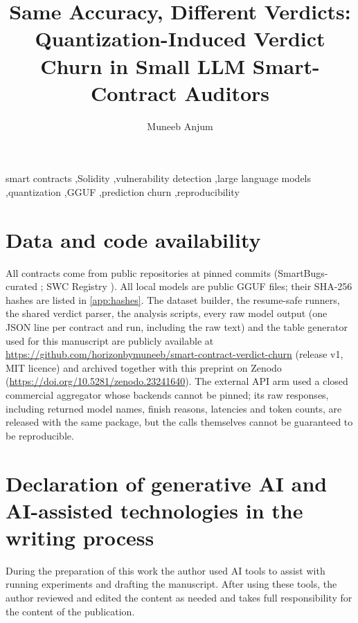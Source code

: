 \documentclass[preprint,10pt,a4paper]{elsarticle}
\begin{document}
\begin{frontmatter}
\title{Same Accuracy, Different Verdicts: Quantization-Induced Verdict Churn in Small LLM Smart-Contract Auditors}

\author{Muneeb Anjum}



\begin{keyword}
smart contracts \sep Solidity \sep vulnerability detection \sep large language models \sep quantization \sep GGUF \sep prediction churn \sep reproducibility
\end{keyword}
\end{frontmatter}



\section*{Data and code availability}\label{sec:repro}
All contracts come from public repositories at pinned commits (SmartBugs-curated \texttt{}; SWC Registry \texttt{}). All local models are public GGUF files; their SHA-256 hashes are listed in \ref{app:hashes}. The dataset builder, the resume-safe runners, the shared verdict parser, the analysis scripts, every raw model output (one JSON line per contract and run, including the raw text) and the table generator used for this manuscript are publicly available at \url{https://github.com/horizonbymuneeb/smart-contract-verdict-churn} (release v1, MIT licence) and archived together with this preprint on Zenodo (\url{https://doi.org/10.5281/zenodo.23241640}). The external API arm used a closed commercial aggregator whose backends cannot be pinned; its raw responses, including returned model names, finish reasons, latencies and token counts, are released with the same package, but the calls themselves cannot be guaranteed to be reproducible.

\section*{Declaration of generative AI and AI-assisted technologies in the writing process}
During the preparation of this work the author used AI tools to assist with running experiments and drafting the manuscript. After using these tools, the author reviewed and edited the content as needed and takes full responsibility for the content of the publication.
\end{document}
